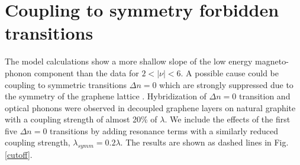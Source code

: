 \documentclass[pra,aps,superscriptaddress,preprint]{revtex4-1}
\begin{document}
\section{Coupling to symmetry forbidden transitions}

 The model calculations show a more shallow slope of the low energy magneto-phonon component than the data for $2 < \left|\nu\right| < 6$. A possible cause could be coupling to symmetric transitions $\Delta n = 0$ which are strongly suppressed due to the symmetry of the graphene lattice \cite{PhysRevB.84.235138}. Hybridization of $\Delta n =0$ transition and optical phonons were observed in decoupled graphene layers on natural graphite \cite{faugeras2011magneto,kuhne2012polarization} with a coupling strength of almost 20\% of $\lambda$. We include the effects of the first five $\Delta n = 0$ transitions by adding resonance terms with a similarly reduced coupling strength, $\lambda_{symm} =0.2\lambda$. The results are shown as dashed lines in Fig.\,\ref{cutoff}.


%
%

%



\end{document}
